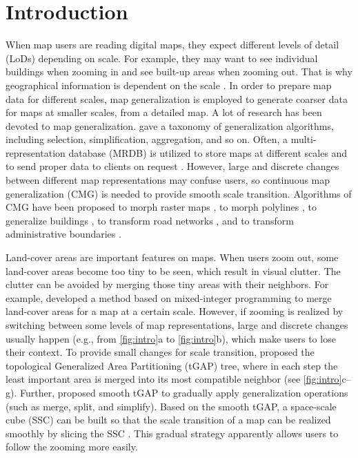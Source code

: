 \documentclass[ijgi,article,submit,moreauthors,pdftex]{Definitions/mdpi}
\begin{document}



\section{Introduction}


When map users are reading digital maps,
they expect different levels of detail (LoDs) depending on scale.
For example, they may want to see individual buildings when zooming in
and see built-up areas when zooming out.
That is why geographical information is dependent on the scale
\citep{Muller1995Generalization,Weibel1997}. 
In order to prepare map data for different scales,
map generalization is employed to generate coarser data 
for maps at smaller scales,
from a detailed map.
A lot of research has been devoted to map generalization.
\citet{Mackaness2017Generalization} gave a taxonomy of 
generalization algorithms, 
including selection, simplification, aggregation, and so on.
Often, a multi-representation database (MRDB) is utilized to store
maps at different scales and to send proper data to clients on request
\citep[\eg][]{Hampe2004multiple}.
However, large and discrete changes between different map representations
may confuse users,
so continuous map generalization (CMG) is needed to
provide smooth scale transition.
Algorithms of CMG have been proposed 
to morph raster maps
\citep[\eg][]{Pantazis2009a,Pantazis2009b}, 
to morph polylines
\citep[\eg][]{Noellenburg2008,Peng2013LSA,Deng2015,Li2017Annealing},
to generalize buildings
\citep[\eg][]{Li2017_Building,Peng2017Building,Touya2017Progressive},
to transform road networks
\citep[\eg][]{Suba2016Road,Chimani2014Eat},
and to transform administrative boundaries
\citep[\eg][]{Peng2016Admin}.


Land-cover areas are important features on maps. 
When users zoom out,
some land-cover areas become too tiny to be seen,
which result in visual clutter.
The clutter can be avoided by merging those tiny areas 
with their neighbors.
For example, \citet{haunert2008f} developed a method based on
mixed-integer programming to merge land-cover areas
for a map at a certain scale.
However, if zooming is realized by switching between
some levels of map representations, 
large and discrete changes usually happen
(e.g., from \fig\ref{fig:intro}a to \fig\ref{fig:intro}b), 
which make users to lose their context.
To provide small changes for scale transition, 
\citet{vanOosterom2005} proposed 
the topological Generalized Area Partitioning (tGAP) tree,
where in each step the least important area is merged into
its most compatible neighbor 
(see \fig\ref{fig:intro}c--g).
Further, \citet{vanOosterom2014Support} proposed smooth tGAP
to gradually apply generalization operations 
(such as merge, split, and simplify).
Based on the smooth tGAP, a space-scale cube (SSC) can be built so that 
the scale transition of a map can be realized smoothly
by slicing the SSC \citep[see][]{Meijers2020Web}.
This gradual strategy apparently allows users 
to follow the zooming more easily.
\end{document}

